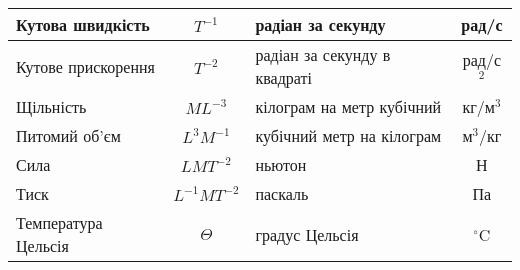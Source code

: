 \begin{table}[h]
\begin{tabular}{|>{\raggedright}m{5cm}|c|m{4cm}|c|}
Кутова швидкість & $T^{-1}$ & радіан за секунду & рад/с \\[0pt]\hline\vspace{4pt}
Кутове прискорення & $T^{-2}$ & радіан за секунду в квадраті & рад/с$^2$ \\[0pt]\hline\vspace{4pt}
Щільність & $ML^{-3}$ & кілограм на метр кубічний & кг/м$^3$ \\[0pt]\hline\vspace{4pt}
Питомий об'єм & $L^3M^{-1}$ & кубічний метр на кілограм & м$^3$/кг \\[0pt]\hline\vspace{4pt}
Сила & $LMT^{-2}$ & ньютон & Н \\[0pt]\hline\vspace{4pt}
Тиск & $L^{-1}MT^{-2}$ & паскаль & Па \\[0pt]\hline\vspace{4pt}
Температура Цельсія & $\Theta$ & градус Цельсія & $^\circ$C \\[0pt]\hline 
	\end{tabular}
\end{table}